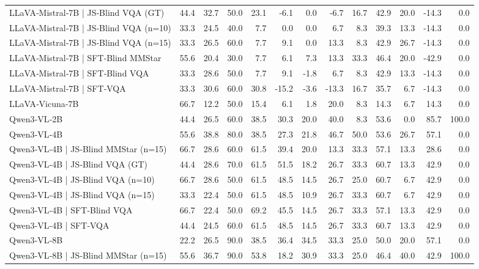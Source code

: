 \begin{tabular}{lrrrrrrrrrrrr}
LLaVA‑Mistral‑7B | JS‑Blind VQA (GT) & 44.4 & 32.7 & 50.0 & 23.1 & -6.1 & 0.0 & -6.7 & 16.7 & 42.9 & 20.0 & -14.3 & 0.0 \\
LLaVA‑Mistral‑7B | JS‑Blind VQA (n=10) & 33.3 & 24.5 & 40.0 & 7.7 & 0.0 & 0.0 & 6.7 & 8.3 & 39.3 & 13.3 & -14.3 & 0.0 \\
LLaVA‑Mistral‑7B | JS‑Blind VQA (n=15) & 33.3 & 26.5 & 60.0 & 7.7 & 9.1 & 0.0 & 13.3 & 8.3 & 42.9 & 26.7 & -14.3 & 0.0 \\
LLaVA‑Mistral‑7B | SFT‑Blind MMStar & 55.6 & 20.4 & 30.0 & 7.7 & 6.1 & 7.3 & 13.3 & 33.3 & 46.4 & 20.0 & -42.9 & 0.0 \\
LLaVA‑Mistral‑7B | SFT‑Blind VQA & 33.3 & 28.6 & 50.0 & 7.7 & 9.1 & -1.8 & 6.7 & 8.3 & 42.9 & 13.3 & -14.3 & 0.0 \\
LLaVA‑Mistral‑7B | SFT‑VQA & 33.3 & 30.6 & 60.0 & 30.8 & -15.2 & -3.6 & -13.3 & 16.7 & 35.7 & 6.7 & -14.3 & 0.0 \\
LLaVA‑Vicuna‑7B & 66.7 & 12.2 & 50.0 & 15.4 & 6.1 & 1.8 & 20.0 & 8.3 & 14.3 & 6.7 & 14.3 & 0.0 \\
Qwen3‑VL‑2B & 44.4 & 26.5 & 60.0 & 38.5 & 30.3 & 20.0 & 40.0 & 8.3 & 53.6 & 0.0 & 85.7 & 100.0 \\
Qwen3‑VL‑4B & 55.6 & 38.8 & 80.0 & 38.5 & 27.3 & 21.8 & 46.7 & 50.0 & 53.6 & 26.7 & 57.1 & 0.0 \\
Qwen3‑VL‑4B | JS‑Blind MMStar (n=15) & 66.7 & 28.6 & 60.0 & 61.5 & 39.4 & 20.0 & 13.3 & 33.3 & 57.1 & 13.3 & 28.6 & 0.0 \\
Qwen3‑VL‑4B | JS‑Blind VQA (GT) & 44.4 & 28.6 & 70.0 & 61.5 & 51.5 & 18.2 & 26.7 & 33.3 & 60.7 & 13.3 & 42.9 & 0.0 \\
Qwen3‑VL‑4B | JS‑Blind VQA (n=10) & 66.7 & 28.6 & 50.0 & 61.5 & 48.5 & 14.5 & 26.7 & 25.0 & 60.7 & 6.7 & 42.9 & 0.0 \\
Qwen3‑VL‑4B | JS‑Blind VQA (n=15) & 33.3 & 22.4 & 50.0 & 61.5 & 48.5 & 10.9 & 26.7 & 33.3 & 60.7 & 6.7 & 42.9 & 0.0 \\
Qwen3‑VL‑4B | SFT‑Blind VQA & 66.7 & 22.4 & 50.0 & 69.2 & 45.5 & 14.5 & 26.7 & 33.3 & 57.1 & 13.3 & 42.9 & 0.0 \\
Qwen3‑VL‑4B | SFT‑VQA & 44.4 & 24.5 & 60.0 & 61.5 & 48.5 & 14.5 & 26.7 & 33.3 & 60.7 & 13.3 & 42.9 & 0.0 \\
Qwen3‑VL‑8B & 22.2 & 26.5 & 90.0 & 38.5 & 36.4 & 34.5 & 33.3 & 25.0 & 50.0 & 20.0 & 57.1 & 0.0 \\
Qwen3‑VL‑8B | JS‑Blind MMStar (n=15) & 55.6 & 36.7 & 90.0 & 53.8 & 18.2 & 30.9 & 33.3 & 25.0 & 46.4 & 40.0 & 42.9 & 100.0 \\

\end{tabular}
